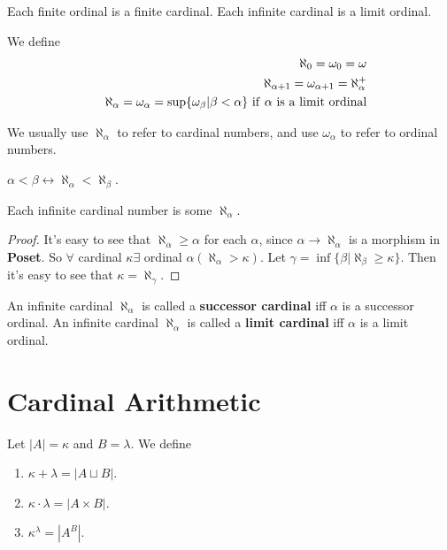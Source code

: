 \documentclass[12pt]{book}
\begin{document}
\begin{corollary}
	Each finite ordinal is a finite cardinal. Each infinite cardinal is a limit ordinal. 
\end{corollary}

\begin{definition}
	We define 
	\begin{eqnarray}
		&&\aleph_0=\omega_0=\omega\\
		&&\aleph_{\alpha+1}=\omega_{\alpha+1}=\aleph_\alpha^+\\
		&&\aleph_\alpha=\omega_\alpha=\sup\{\omega_\beta|\beta<\alpha\}{\rm\ if\ } \alpha {\rm\ is\ a\ limit\ ordinal}
	\end{eqnarray}
	
	We usually use $\aleph_\alpha$ to refer to cardinal numbers, and use $\omega_\alpha$ to refer to ordinal numbers.  
\end{definition}
\begin{lemma}
	$\alpha<\beta\leftrightarrow \aleph_\alpha<\aleph_\beta$.
\end{lemma}

\begin{lemma}
	Each infinite cardinal number is some $\aleph_\alpha$.
\end{lemma}
\begin{proof}
	It's easy to see that $\aleph_\alpha\geq\alpha$ for each $\alpha$, since $\alpha\rightarrow\aleph_\alpha$ is a morphism in {\bf Poset}. So $\forall$ cardinal $\kappa \exists $ ordinal $\alpha(\aleph_\alpha>\kappa)$. Let $\gamma=\inf\{\beta|\aleph_\beta\geq\kappa\}$. Then it's easy to see that $\kappa=\aleph_\gamma$.
\end{proof}

\begin{definition}
	An infinite cardinal $\aleph_\alpha$ is called a {\bf successor cardinal} iff $\alpha$ is a successor ordinal. An infinite cardinal $\aleph_\alpha$ is called a {\bf limit cardinal} iff $\alpha$ is a limit ordinal.
\end{definition}

\section{Cardinal Arithmetic}
\begin{definition}
	Let $|A|=\kappa$ and $B=\lambda$. We define
	\begin{enumerate}
		\item $\kappa+\lambda=|A\sqcup B|$.
		\item $\kappa\cdot\lambda=|A\times B|$.
		\item $\kappa^\lambda=|A^B|$.
	\end{enumerate}
\end{definition}
\end{document}
